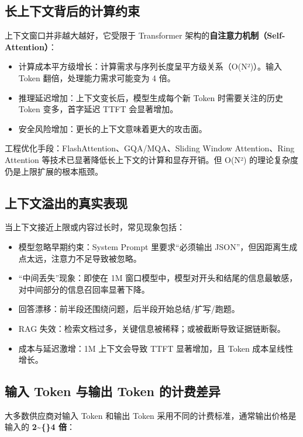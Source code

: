 \documentclass[10pt,a4paper]{ctexart}
\begin{document}
\subsection{长上下文背后的计算约束}


上下文窗口并非越大越好，它受限于 Transformer 架构的\textbf{自注意力机制（Self-Attention）}：


\begin{itemize}[itemsep=2pt, topsep=4pt]
  \item 计算成本平方级增长：计算需求与序列长度呈平方级关系（O(N²)）。输入 Token 翻倍，处理能力需求可能变为 4 倍。
  \item 推理延迟增加：上下文变长后，模型生成每个新 Token 时需要关注的历史 Token 变多，首字延迟 TTFT 会显著增加。
  \item 安全风险增加：更长的上下文意味着更大的攻击面。
\end{itemize}


工程优化手段：FlashAttention、GQA/MQA、Sliding Window Attention、Ring Attention 等技术已显著降低长上下文的计算和显存开销。但 O(N²) 的理论复杂度仍是上限扩展的根本瓶颈。



\subsection{上下文溢出的真实表现}


当上下文接近上限或内容过长时，常见现象包括：


\begin{itemize}[itemsep=2pt, topsep=4pt]
  \item 模型忽略早期约束：System Prompt 里要求“必须输出 JSON”，但因距离生成点太远，注意力不足导致被忽略。
  \item “中间丢失”现象：即使在 1M 窗口模型中，模型对开头和结尾的信息最敏感，对中间部分的信息召回率显著下降。
  \item 回答漂移：前半段还围绕问题，后半段开始总结/扩写/跑题。
  \item RAG 失效：检索文档过多，关键信息被稀释；或被截断导致证据链断裂。
  \item 成本与延迟激增：1M 上下文会导致 TTFT 显著增加，且 Token 成本呈线性增长。
\end{itemize}


\subsection{输入 Token 与输出 Token 的计费差异}


大多数供应商对输入 Token 和输出 Token 采用不同的计费标准，通常输出价格是输入的 \textbf{2\textasciitilde\{\}4 倍}：
\end{document}
